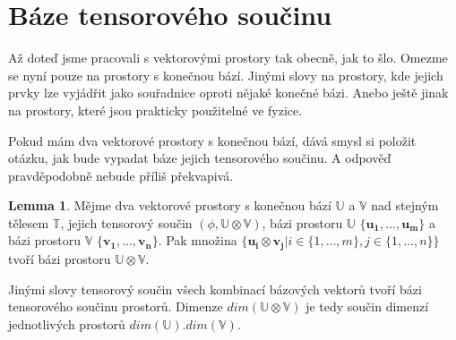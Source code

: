 \documentclass[a5paper,12pt]{amsbook}
\theoremstyle{definition}
\newtheorem{lemma}[theorem]{Lemma}
\newcommand{\myvec}[1]{\bm{#1}}
\newcommand{\myspace}[1]{\mathbb{#1}}
\begin{document}
\section{Báze tensorového součinu}

\noindent
Až doteď jsme pracovali s vektorovými prostory tak obecně, jak to šlo. Omezme se nyní pouze na
prostory s konečnou bází. Jinými slovy na prostory, kde jejich prvky lze vyjádřit jako souřadnice
oproti nějaké konečné bázi. Anebo ještě jinak na prostory, které jsou prakticky použitelné ve
fyzice.

Pokud mám dva vektorové prostory s konečnou bází, dává smysl si položit otázku, jak bude
vypadat báze jejich tensorového součinu. A odpověď pravděpodobně nebude příliš překvapivá.

\begin{lemma}
\label{lemma:tensor_basis}
Mějme dva vektorové prostory s konečnou bází $\myspace{U}$ a $\myspace{V}$ nad stejným tělesem
$\myspace{T}$, jejich tensorový součin $(\phi, \myspace{U}\otimes\myspace{V})$, bázi prostoru
$\myspace{U}$ $\{\myvec{u_1}, \dots, \myvec{u_m}\}$ a bázi prostoru $\myspace{V}$
$\{\myvec{v_1}, \dots, \myvec{v_n}\}$. Pak množina $\{\myvec{u_i}\otimes\myvec{v_j}| i \in
\{1, \dots, m\}, j \in \{1, \dots, n\}\}$ tvoří bázi prostoru $\myspace{U}\otimes\myspace{V}$.
\end{lemma}

Jinými slovy tensorový součin všech kombinací bázových vektorů tvoří bázi tensorového součinu
prostorů. Dimenze $dim(\myspace{U}\otimes\myspace{V})$ je tedy součin dimenzí jednotlivých
prostorů $dim(\myspace{U}).dim(\myspace{V})$.
\end{document}
